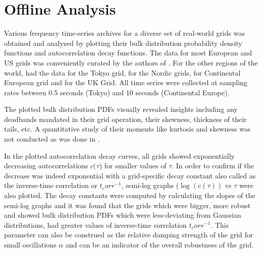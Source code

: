 \section[Offline/Postmortem Analysis]{Offline Analysis}
\label{sec:offline}

Various frequency time-series archives for a diverse set of real-world grids was obtained and analyzed by plotting their bulk distribution probability density functions and autocorrelation decay functions. The data for most European and US grids was conveniently curated by the authors of \cite{lrydin01, lrydinGithub}. For the other regions of the world, \cite{tokyo2017, tokyo2020} had the data for the Tokyo grid, \cite{nordic2018, nordic2019} for the Nordic grids, \cite{ce2019, ce2020} for Continental European grid and \cite{ukNationalGridESOData} for the UK Grid.
All time series were collected at sampling rates between 0.5 seconds (Tokyo) and 10 seconds (Continental Europe).

The plotted bulk distribution PDFs visually revealed insights including any deadbands \cite{francesca01, vorobev01} mandated in their grid operation, their skewness, thickness of their tails, etc. A quantitative study of their moments like kurtosis and skewness was not conducted as was done in \cite{schafer01}.

In the plotted autocorrelation decay curves, all grids showed exponentially decreasing autocorrelations $c(\tau$) for smaller values of $\tau$. In order to confirm if the decrease was indeed exponential with a grid-specific decay constant also called as the inverse-time correlation or ${t_corr}^{-1}$, semi-log graphs ($\log(c(\tau))$ vs $\tau$ were also plotted. The decay constants were computed by calculating the slopes of the semi-log graphs and it was found that the grids which were bigger, more robust and showed bulk distribution PDFs which were less-deviating from Gaussian distributions, had greater values of inverse-time correlation ${t_corr}^{-1}$. This parameter can also be construed as the relative damping strength of the grid for small oscillations $\alpha$ and can be an indicator of the overall robustness of the grid.